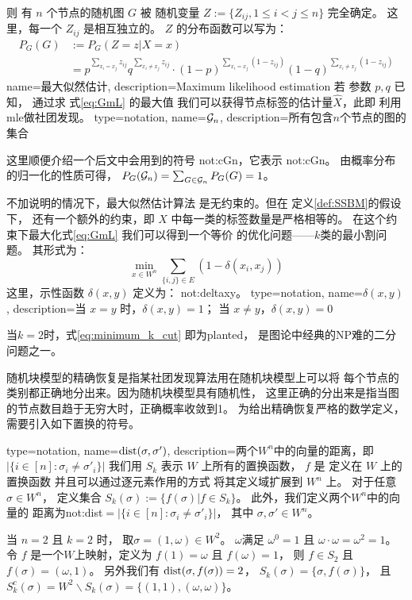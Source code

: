 则 有 $n$ 个节点的随机图 $G$ 
被 
随机变量 $Z:=\{Z_{ij}, 1\leq i<j\leq n\}$ 完全确定。
这里，每一个 $Z_{ij}$ 是相互独立的。
$Z$ 的分布函数可以写为：
\begin{align}\label{eq:mle_sibm}
P_G(G)&:=P_G(Z = z| X=x) \\
&= p^{\sum_{x_i = x_j}
z_{ij}}q^{\sum_{x_i \neq x_j} z_{ij}} 
\cdot (1-p)^{\sum_{x_i = x_j} (1-z_{ij})}
(1-q)^{\sum_{x_i \neq x_j} (1-z_{ij})}
\label{eq:GmL}
\end{align}
{name=最大似然估计,
description={Maximum likelihood estimation}}
若 参数 $p, q$ 已知，
通过求
式\eqref{eq:GmL} 的最大值
我们可以获得节点标签的估计量$\hat{X}$，此即
利用\gls{mle}做社团发现。
{
  type=notation,
  name={$\mathcal{G}_n$},
  description={所有包含$n$个节点的图的集合}
}

这里顺便介绍一个后文中会用到的符号 \gls{not:cGn}，它表示
\glsdesc{not:cGn}。
由概率分布的归一化的性质可得，
$P_G(\mathcal{G}_n) = \sum_{G\in \mathcal{G}_n}P_G(G)=1$。

不加说明的情况下，最大似然估计算法 是无约束的。但在
定义\ref{def:SSBM}的假设下，
还有一个额外的约束，即 $X$ 中每一类的标签数量是严格相等的。
在这个约束下最大化式\eqref{eq:GmL} 我们可以得到一个等价
的优化问题——$k$类的最小割问题。
其形式为：
\begin{equation}\label{eq:minimum_k_cut}
  \min_{x\in W^n} \sum_{ \{i,j\} \in E} (1-\delta(x_i, x_j))
\end{equation}
这里，示性函数 $\delta(x,y)$ 定义为：
\glsdesc{not:deltaxy}。
{
  type=notation,
  name={$\delta(x,y)$},
  description={当 $x=y$ 时，$\delta(x,y) = 1$； 当 $x\neq y$，$\delta(x,y)=0$}
}

当$k=2$时，式\eqref{eq:minimum_k_cut} 即为\gls{planted}，
是图论中经典的NP难的二分问题之一。


随机块模型的精确恢复是指某社团发现算法用在随机块模型上可以将
每个节点的类别都正确地分出来。因为随机块模型具有随机性，
这里正确的分出来是指当图的节点数目趋于无穷大时，正确概率收敛到1。
为给出精确恢复严格的数学定义，需要引入如下置换的符号。

{
  type=notation,
  name={$\operatorname{dist}(\sigma, \sigma')$},
  description={两个$W^n$中的向量的距离，即$|\{i\in[n]:\sigma_i\neq \sigma'_i\}|$}
}
我们用 $S_k$ 表示 $W$  上所有的置换函数， 
$f$ 是 定义在 $W$ 上的置换函数
并且可以通过逐元素作用的方式
将其定义域扩展到 $W^n$ 上。
对于任意 $\sigma \in W^n$，
定义集合 $S_k(\sigma):=\{f(\sigma)| f\in S_k\}$。
此外，我们定义两个$W^n$中的向量的
距离为\gls{not:dist}$=|\{i\in[n]:\sigma_i\neq \sigma'_i\}|$，
其中 $\sigma,\sigma'\in W^n
$。
\begin{example}
当 $n=2$ 且 $k=2$ 时，
取$\sigma=(1, \omega) \in W^2$。
$\omega$满足
$\omega^0 = 1$ 且 $\omega \cdot \omega = \omega^2 = 1$。
令 $f$ 是一个$W$上映射，定义为
$f(1) = \omega$ 且 $f(\omega)=1$，
则 $f \in S_2$ 且 $f(\sigma) = (\omega, 1)$。
另外我们有 $\operatorname{dist}(\sigma, f(\sigma)) = 2$，
$S_k(\sigma) = \{\sigma, f(\sigma)\}$， 且
$S_k^c(\sigma) = W^2 \backslash S_k(\sigma)
=\{(1, 1), (\omega, \omega)\}$。
\end{example}

